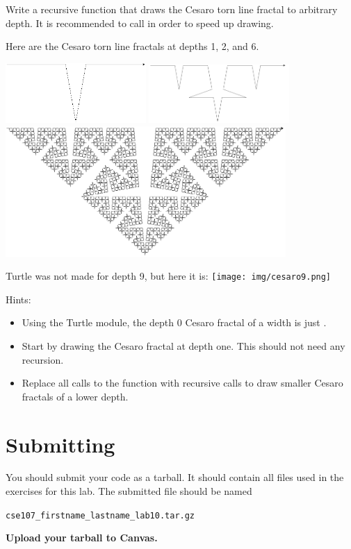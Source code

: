 \documentclass[11pt]{cselabheader}
\begin{document}
\begin{ex}[cesaro.py]
Write a recursive function that draws the Cesaro torn line fractal to
arbitrary depth. It is recommended to call
 in order to speed up drawing.

Here are the Cesaro torn line fractals at depths 1, 2, and 6.
\begin{center}
\includegraphics[width=0.4\textwidth]{img/cesaro1.png}
\includegraphics[width=0.4\textwidth]{img/cesaro2.png}
\includegraphics[width=0.8\textwidth]{img/cesaro6.png}

Turtle was not made for depth 9, but here it is:
\texttt{[image: img/cesaro9.png]}
\end{center}

Hints:
\begin{itemize}
\item Using the Turtle module, the depth 0 Cesaro fractal of a width
 is just .
\item Start by drawing the Cesaro fractal at depth one. This should
not need any recursion.
\item Replace all calls to the  function
with recursive calls to draw smaller Cesaro fractals of a lower depth.
\end{itemize}
\end{ex}

\newpage
\section{Submitting}

You should submit your code as a tarball. It should contain all files
used in the exercises for this lab. The submitted file should be named
\begin{center}
  \texttt{cse107\_firstname\_lastname\_lab10.tar.gz}
\end{center}

\begin{center}
  \textbf{Upload your tarball to Canvas.}
\end{center}

\listofexercises
\end{document}
